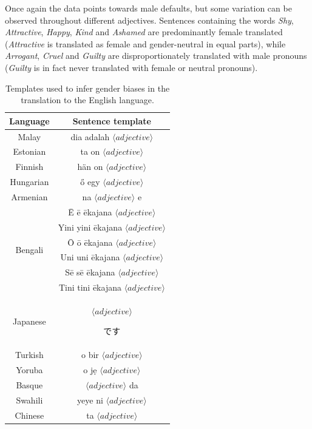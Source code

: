 \documentclass[fleqn,10pt]{article}
\begin{document}
Once again the data points towards male defaults, but some variation can be observed throughout different adjectives. Sentences containing the words \emph{Shy}, \emph{Attractive}, \emph{Happy}, \emph{Kind} and \emph{Ashamed} are predominantly female translated (\emph{Attractive} is translated as female and gender-neutral in equal parts), while \emph{Arrogant}, \emph{Cruel} and \emph{Guilty} are disproportionately translated with male pronouns (\emph{Guilty} is in fact never translated with female or neutral pronouns).

\begin{table}[H]
\centering
\small{
	\begin{tabular}{|c|c|}
	\hline
	Language 	& Sentence template 													\\ \hline \hline
	Malay		& dia adalah $\langle adjective \rangle$ 								\\ \hline
	Estonian	& ta on $\langle adjective \rangle$ 									\\ \hline
	Finnish		& hän on $\langle adjective \rangle$ 									\\ \hline
	Hungarian	& ő egy $\langle adjective \rangle$ 									\\ \hline
	Armenian	& na $\langle adjective \rangle$ e 										\\ \hline
	\multirow{6}{*}{Bengali}	& Ē ē ēkajana $\langle adjective \rangle$				\\
								& Yini yini ēkajana $\langle adjective \rangle$			\\
								& Ō ō ēkajana $\langle adjective \rangle$				\\
								& Uni uni ēkajana $\langle adjective \rangle$			\\
								& Sē sē ēkajana $\langle adjective \rangle$				\\
								& Tini tini ēkajana $\langle adjective \rangle$			\\ \hline
	Japanese	& $\langle adjective \rangle$ \begin{CJK*}{UTF8}{min}です\end{CJK*}		\\ \hline
	Turkish		& o bir $\langle adjective \rangle$ 									\\ \hline
	Yoruba		& o jẹ $\langle adjective \rangle$ 										\\ \hline
	Basque		& $\langle adjective \rangle$ da 										\\ \hline
	Swahili		& yeye ni $\langle adjective \rangle$ 									\\ \hline
	Chinese		& ta $\langle adjective \rangle$ 										\\ \hline
	\end{tabular}
	}
	\caption{Templates used to infer gender biases in the translation to the English language.}
	\label{tab:templates-adjectives}
\end{table}
\end{document}
